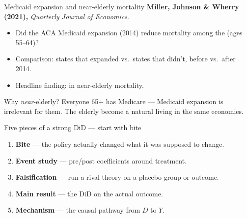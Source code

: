 \documentclass[aspectratio=169,11pt]{beamer}
\begin{document}
\begin{frame}{Medicaid expansion and near-elderly mortality}
\vspace{0.5em}
\textbf{Miller, Johnson \& Wherry (2021),} \textit{Quarterly Journal of Economics}.
\vspace{0.6em}
\begin{itemize}\small\setlength\itemsep{0.4em}
  \item Did the ACA Medicaid expansion (2014) reduce mortality among the  (ages 55--64)?
  \item Comparison: states that expanded vs.\ states that didn't, before vs.\ after 2014.
  \item Headline finding:  in near-elderly mortality.
\end{itemize}
\vspace{0.6em}
\begin{block}{Why \textit{near}-elderly?}
\small
Everyone 65$+$ has Medicare --- Medicaid expansion is irrelevant for them. \;The elderly become a natural  living in the same economies.
\end{block}
\vspace{0.4em}
\end{frame}

\begin{frame}{Five pieces of a strong DiD --- start with bite}
\vspace{0.6em}
\begin{enumerate}
  \item \textbf{\color{accent}Bite} --- the policy actually changed what it was supposed to change.
  \item \textbf{\color{warmgray!40}Event study} \textcolor{warmgray!40}{--- pre/post coefficients around treatment.}
  \item \textbf{\color{warmgray!40}Falsification} \textcolor{warmgray!40}{--- run a rival theory on a placebo group or outcome.}
  \item \textbf{\color{warmgray!40}Main result} \textcolor{warmgray!40}{--- the DiD on the actual outcome.}
  \item \textbf{\color{warmgray!40}Mechanism} \textcolor{warmgray!40}{--- the causal pathway from $D$ to $Y$.}
\end{enumerate}
\vspace{0.6em}
\end{frame}
\end{document}
